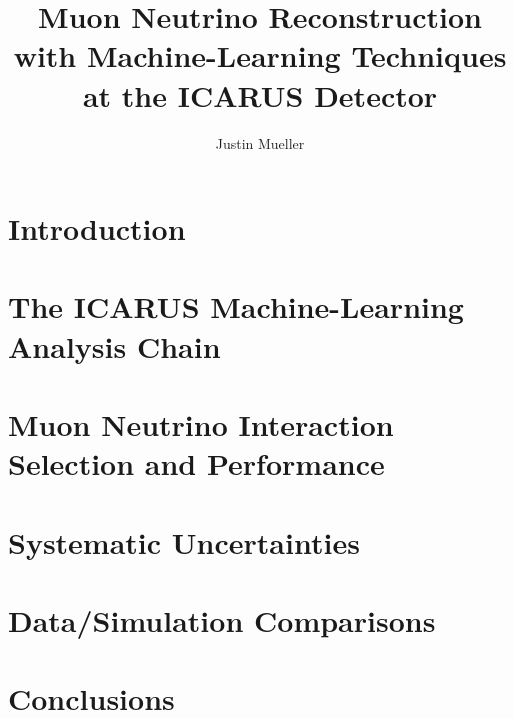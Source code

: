 \documentclass[a4paper,11pt]{article}
\begin{document}

\title{Muon Neutrino Reconstruction with Machine-Learning Techniques at the ICARUS Detector}
\author{Justin Mueller}
\maketitle


\abstract{

}

\tableofcontents


\section{Introduction}
\label{chap:introduction}


\section{The ICARUS Machine-Learning Analysis Chain}
\label{chap:mlreco}


\section{Muon Neutrino Interaction Selection and Performance}
\label{chap:neutrino_selection}


\section{Systematic Uncertainties}
\label{chap:systematics}


\section{Data/Simulation Comparisons}
\label{chap:data_mc_comparisons}


\section{Conclusions}
\label{chap:conclusion}






\appendix
\end{document}
